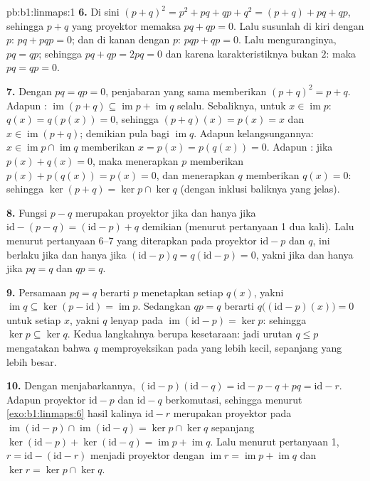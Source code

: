 \begin{solution}{pb:b1:linmaps:1}
\textbf{6.} Di sini $(p + q)^2 = p^2 + pq + qp + q^2 = (p + q) + pq +
qp$, sehingga $p + q$ yang proyektor memaksa $pq + qp = 0$. Lalu susunlah di
kiri dengan $p$: $pq + pqp = 0$; dan di kanan dengan $p$: $pqp + qp
= 0$. Lalu menguranginya, $pq = qp$; sehingga $pq + qp = 2pq = 0$ dan karena
karakteristiknya bukan $2$: maka $pq = qp = 0$.

\textbf{7.} Dengan $pq = qp = 0$, penjabaran yang sama memberikan $(p +
q)^2 = p + q$. Adapun : $\operatorname{im}(p + q) \subseteq
\operatorname{im} p + \operatorname{im} q$ selalu. Sebaliknya,
untuk $x \in \operatorname{im} p$: $q(x) = q(p(x)) = 0$, sehingga $(p +
q)(x) = p(x) = x$ dan $x \in \operatorname{im}(p+q)$; demikian pula bagi
$\operatorname{im} q$. Adapun kelangsungannya: $x \in \operatorname{im} p
\cap \operatorname{im} q$ memberikan $x = p(x) = p(q(x)) = 0$.
Adapun : jika $p(x) + q(x) = 0$, maka menerapkan $p$ memberikan $p(x) +
p(q(x)) = p(x) = 0$, dan menerapkan $q$ memberikan $q(x) = 0$: sehingga $\ker(p
+ q) = \ker p \cap \ker q$ (dengan inklusi baliknya yang jelas).

\textbf{8.} Fungsi $p - q$ merupakan proyektor jika dan hanya jika $\mathrm{id} - (p - q) =
(\mathrm{id} - p) + q$ demikian (menurut pertanyaan 1 dua kali). Lalu menurut pertanyaan
6--7 yang diterapkan pada proyektor $\mathrm{id} - p$ dan $q$, ini
berlaku jika dan hanya jika $(\mathrm{id} - p)q = q(\mathrm{id} - p) = 0$, yakni
jika dan hanya jika $pq = q$ dan $qp = q$.

\textbf{9.} Persamaan $pq = q$ berarti $p$ menetapkan setiap $q(x)$, yakni
$\operatorname{im} q \subseteq \ker(p - \mathrm{id}) =
\operatorname{im} p$. Sedangkan $qp = q$ berarti $q\bigl((\mathrm{id} -
p)(x)\bigr) = 0$ untuk setiap $x$, yakni $q$ lenyap pada
$\operatorname{im}(\mathrm{id} - p) = \ker p$: sehingga $\ker p \subseteq
\ker q$. Kedua langkahnya berupa kesetaraan: jadi urutan $q \leq p$ mengatakan bahwa
$q$ memproyeksikan pada  yang lebih kecil, sepanjang  yang lebih besar.

\textbf{10.} Dengan menjabarkannya, $(\mathrm{id} - p)(\mathrm{id} - q) =
\mathrm{id} - p - q + pq = \mathrm{id} - r$. Adapun proyektor
$\mathrm{id} - p$ dan $\mathrm{id} - q$ berkomutasi, sehingga menurut
\cref{exo:b1:linmaps:6} hasil kalinya $\mathrm{id} - r$ merupakan
proyektor pada $\operatorname{im}(\mathrm{id} - p) \cap
\operatorname{im}(\mathrm{id} - q) = \ker p \cap \ker q$ sepanjang
$\ker(\mathrm{id} - p) + \ker(\mathrm{id} - q) =
\operatorname{im} p + \operatorname{im} q$. Lalu menurut pertanyaan 1, $r =
\mathrm{id} - (\mathrm{id} - r)$ menjadi proyektor dengan
$\operatorname{im} r = \operatorname{im} p + \operatorname{im}
q$ dan $\ker r = \ker p \cap \ker q$.


\end{solution}
